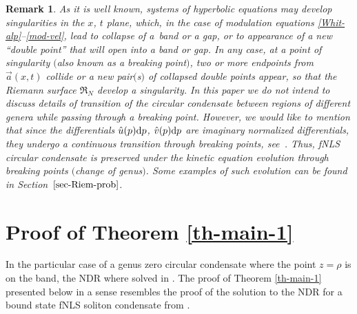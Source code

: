 \documentclass[pdftex]{sigma}
\numberwithin{equation}{section}
\newtheorem{Remark}[Theorem]{Remark}
\begin{document}
\begin{Remark}\label{rem-break}
As it is well known, systems of hyperbolic equations may develop singularities in the $x$, $t$ plane, which, in the case of modulation equations \eqref{Whit-alp}--\eqref{mod-vel}, lead to collapse of a~band or a gap, or to appearance of a new ``double point'' that will open into a band or gap. In any case, at a point of singularity $($also known as a breaking point$)$, two or more endpoints from~$\vec a(x,t)$ collide or a new pair$($s$)$ of collapsed double points appear, so that the Riemann surface $\mathfrak R_N$ develop a singularity.
In this paper we do not intend to discuss details of transition of the circular condensate between regions of different genera while passing through a breaking point.
However, we would like to mention that
since the differentials $\hat u(p){\rm d}p$, $\hat v(p){\rm d}p$
are imaginary normalized differentials, they undergo a continuous transition through breaking points, see~{\rm \cite{BT14}}. Thus, fNLS circular condensate is preserved under the kinetic equation evolution through breaking points $($change of genus$)$. Some examples of such evolution can be found in Section~$\ref{sec-Riem-prob}$.
\end{Remark}

\section{Proof of Theorem \ref{th-main-1}}\label{s2}
In the particular case of a genus zero circular condensate where the point $z=\rho$ is on the band, the NDR where solved in \cite{ET2020}.
The proof of Theorem \ref{th-main-1} presented below in a sense resembles the proof of the solution to the NDR for a bound state fNLS soliton condensate from
\cite{KT2021}.
\end{document}
